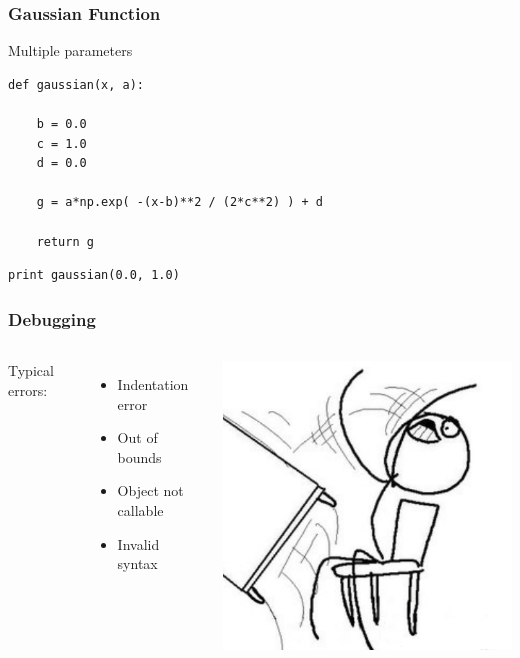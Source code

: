 \documentclass{beamer}
\begin{document}
\begin{frame}[fragile]

    \frametitle{Gaussian Function}

    Multiple parameters

    \bigskip

\begin{lstlisting}
def gaussian(x, a):

    b = 0.0
    c = 1.0
    d = 0.0

    g = a*np.exp( -(x-b)**2 / (2*c**2) ) + d

    return g
\end{lstlisting}

\begin{lstlisting}
print gaussian(0.0, 1.0)
\end{lstlisting}

\end{frame}



\begin{frame}[fragile]

    \frametitle{Debugging}


    \begin{columns}[t]


    Typical errors:


    \begin{itemize}
        \item Indentation error
        \item Out of bounds
        \item Object not callable
        \item Invalid syntax
    \end{itemize}


        
            \includegraphics[width=0.8\linewidth]{flip.jpg}

    \end{columns}


\end{frame}
\end{document}
